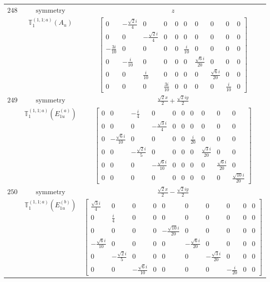 \documentclass[fleqn,8pt,landscape]{jsarticle}
\begin{document}
\begin{longtable}{ccc}
$ 248 $ & $ \text{symmetry} $ & $ z $ \\
$  $ & $ \mathbb{T}_{1}^{(1,1;a)}(A_{u}) $ & $ \begin{bmatrix} 0 & - \frac{\sqrt{2} i}{4} & 0 & 0 & 0 & 0 & 0 & 0 & 0 & 0 \\ 0 & 0 & - \frac{\sqrt{2} i}{4} & 0 & 0 & 0 & 0 & 0 & 0 & 0 \\ - \frac{3 i}{10} & 0 & 0 & 0 & 0 & \frac{i}{10} & 0 & 0 & 0 & 0 \\ 0 & - \frac{i}{10} & 0 & 0 & 0 & 0 & \frac{\sqrt{6} i}{20} & 0 & 0 & 0 \\ 0 & 0 & \frac{i}{10} & 0 & 0 & 0 & 0 & \frac{\sqrt{6} i}{20} & 0 & 0 \\ 0 & 0 & 0 & \frac{3 i}{10} & 0 & 0 & 0 & 0 & \frac{i}{10} & 0 \end{bmatrix} $ \\ \hline
$ 249 $ & $ \text{symmetry} $ & $ \frac{\sqrt{2} x}{2} + \frac{\sqrt{2} i y}{2} $ \\
$  $ & $ \mathbb{T}_{1}^{(1,1;a)}(E_{1u}^{(a)}) $ & $ \begin{bmatrix} 0 & 0 & - \frac{i}{4} & 0 & 0 & 0 & 0 & 0 & 0 & 0 \\ 0 & 0 & 0 & - \frac{\sqrt{3} i}{4} & 0 & 0 & 0 & 0 & 0 & 0 \\ 0 & - \frac{\sqrt{6} i}{10} & 0 & 0 & 0 & 0 & \frac{i}{20} & 0 & 0 & 0 \\ 0 & 0 & - \frac{\sqrt{2} i}{5} & 0 & 0 & 0 & 0 & \frac{\sqrt{3} i}{20} & 0 & 0 \\ 0 & 0 & 0 & - \frac{\sqrt{6} i}{10} & 0 & 0 & 0 & 0 & \frac{\sqrt{6} i}{20} & 0 \\ 0 & 0 & 0 & 0 & 0 & 0 & 0 & 0 & 0 & \frac{\sqrt{10} i}{20} \end{bmatrix} $ \\ \hline
$ 250 $ & $ \text{symmetry} $ & $ \frac{\sqrt{2} x}{2} - \frac{\sqrt{2} i y}{2} $ \\
$  $ & $ \mathbb{T}_{1}^{(1,1;a)}(E_{1u}^{(b)}) $ & $ \begin{bmatrix} \frac{\sqrt{3} i}{4} & 0 & 0 & 0 & 0 & 0 & 0 & 0 & 0 & 0 \\ 0 & \frac{i}{4} & 0 & 0 & 0 & 0 & 0 & 0 & 0 & 0 \\ 0 & 0 & 0 & 0 & - \frac{\sqrt{10} i}{20} & 0 & 0 & 0 & 0 & 0 \\ - \frac{\sqrt{6} i}{10} & 0 & 0 & 0 & 0 & - \frac{\sqrt{6} i}{20} & 0 & 0 & 0 & 0 \\ 0 & - \frac{\sqrt{2} i}{5} & 0 & 0 & 0 & 0 & - \frac{\sqrt{3} i}{20} & 0 & 0 & 0 \\ 0 & 0 & - \frac{\sqrt{6} i}{10} & 0 & 0 & 0 & 0 & - \frac{i}{20} & 0 & 0 \end{bmatrix} $ \\ \hline

\end{longtable}
\end{document}

